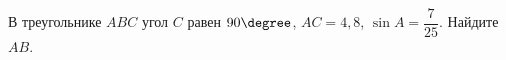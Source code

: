 \begin{ex}
	\begin{condition}
		В треугольнике \( ABC \) угол \( C \) равен \( 90\degree \), \( AC=4,8 \),  \( \sin A=\dfrac{7}{25} \). Найдите \( AB \).
	\end{condition}
\end{ex}